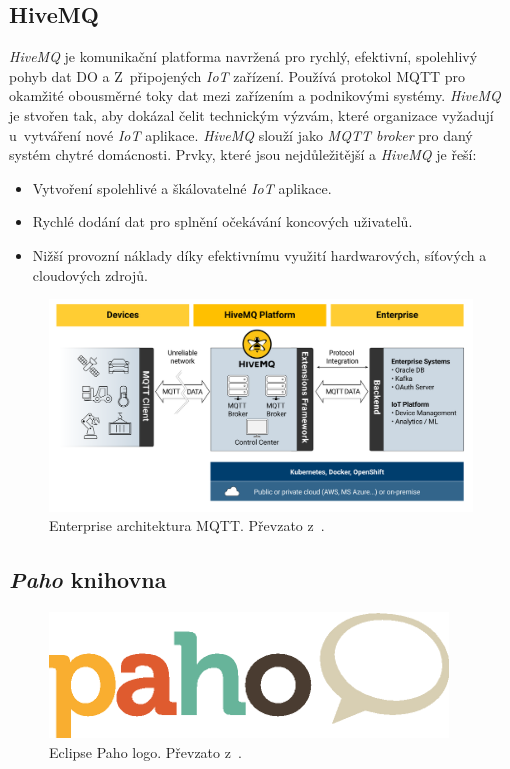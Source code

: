 \newpage
\subsection*{HiveMQ}
\label{pouzite:hivemq}

\emph{HiveMQ} je komunikační platforma navržená pro rychlý, efektivní, spolehlivý pohyb dat DO a Z~připojených \emph{IoT} zařízení.
Používá protokol MQTT pro okamžité obousměrné toky dat mezi zařízením a podnikovými systémy.
\emph{HiveMQ} je stvořen tak, aby dokázal čelit technickým výzvám, které organizace vyžadují u~vytváření nové \emph{IoT} aplikace.
\emph{HiveMQ} slouží jako \emph{MQTT broker} pro daný systém chytré domácnosti.
\newline
Prvky, které jsou nejdůležitější a \emph{HiveMQ} je řeší:
\begin{itemize}
  \item Vytvoření spolehlivé a škálovatelné \emph{IoT} aplikace.
  \item Rychlé dodání dat pro splnění očekávání koncových uživatelů.
  \item Nižší provozní náklady díky efektivnímu využití hardwarových, síťových a cloudových zdrojů.~\cite{hivemq:info}
\end{itemize}

\begin{figure}[hbt]
  \centering
  \includegraphics[width=1 \linewidth]{obrazky-figures/hivemq_arch.png}
  \caption{Enterprise architektura MQTT. Převzato z~\cite{hivemq:info}.}
  \label{figure:hivemq_flow}
\end{figure}

\subsection*{\emph{Paho} knihovna}
\label{pouzite:paho}
\begin{figure}[hbt]
  \centering
  \includegraphics[width=.2 \linewidth]{obrazky-figures/paho.png}
  \caption{Eclipse Paho logo. Převzato z~\cite{paho:info}.}
  \label{figure:paho}
\end{figure}

